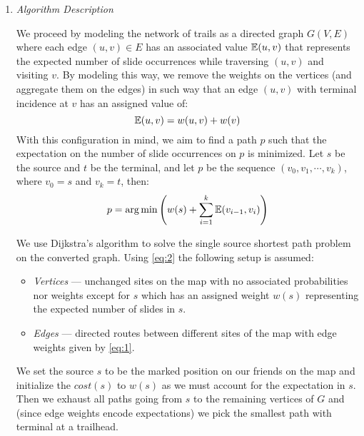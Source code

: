 \documentclass{article}
\begin{document}
\begin{enumerate}[leftmargin={*}, font={\bf}, label={\arabic*.}, ref={\arabic*}]
  \item
    {\itshape Algorithm Description}

    We proceed by modeling the network of trails as a directed graph $G(V, E)$ where each edge $(u,
    v) \in E$ has an associated value $\operatorname*{\mathbb{E}}(u,v)$ that represents the expected number of slide
    occurrences while traversing $(u,v)$ and visiting $v$. By modeling this way, we remove the weights
    on the vertices (and aggregate them on the edges) in such way that an edge $(u,v)$ with terminal
    incidence at $v$ has an assigned value of:
    \begin{equation}
      \operatorname*{\mathbb{E}}(u,v) = w(u,v) + w(v) \label{eq:1}
    \end{equation}
    With this configuration in mind, we aim to find a path $p$ such that the expectation on the number
    of slide occurrences on $p$ is minimized. Let $s$ be the source and $t$ be the terminal, and let
    $p$ be the sequence $(v_0, v_1, \cdots, v_k)$, where $v_0 = s$ and $v_k = t$, then:
    \begin{equation}
      p = \arg \min \left(w(s) + \sum_{i=1}^k \operatorname*{\mathbb{E}}(v_{i-1}, v_i)\right) \label{eq:2}
    \end{equation}

    We use Dijkstra's algorithm to solve the single source shortest path problem on the converted
    graph. Using \autoref{eq:2} the following setup is assumed:
    \begin{itemize}[label={\large$\circ$}, itemsep={0pt}]
      \item
        {\itshape Vertices} --- unchanged sites on the map with no associated probabilities nor
        weights except for $s$ which has an assigned weight $w(s)$ representing the expected number
        of slides in $s$.
      \item
        {\itshape Edges} --- directed routes between different sites of the map with edge weights
        given by \eqref{eq:1}.
    \end{itemize}
    We set the source $s$ to be the marked position on our friends on the map and initialize the
    $cost(s)$ to $w(s)$ as we must account for the expectation in $s$. Then we exhaust all paths
    going from $s$ to the remaining vertices of $G$ and (since edge weights encode expectations)
    we pick the smallest path with terminal at a trailhead. \\


\end{enumerate}
\end{document}

